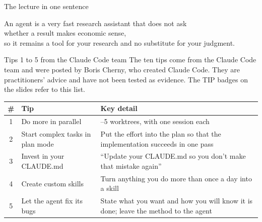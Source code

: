 \documentclass[aspectratio=169,10pt]{beamer}
\newcommand{\emphc}[1]{\textcolor{harvardcrimson}{#1}}
\begin{document}
\begin{frame}{The lecture in one sentence}
\begin{center}
{\large An agent is a very fast research assistant that does not ask\\[4pt] whether a result makes economic sense,}\\[12pt]
{\large \emphc{so it remains a tool for your research and no substitute for your judgment.}}
\end{center}
\end{frame}

\begin{frame}{Tips 1 to 5 from the Claude Code team}
The ten tips come from the Claude Code team and were posted by Boris Cherny, who created Claude Code. They are practitioners' advice and have not been tested as evidence. The TIP badges on the slides refer to this list.

\vspace{0.5em}
\begin{center}
\renewcommand{\arraystretch}{1.45}
\begin{tabular}{@{}c >{\raggedright\arraybackslash}p{4.8cm} >{\raggedright\arraybackslash}p{7.4cm}@{}}
\toprule
\textbf{\#} & \textbf{Tip} & \textbf{Key detail} \\
\midrule
1 & Do more in \emphc{parallel} & 3--5 worktrees, with one session each \\
2 & Start complex tasks in \emphc{plan mode} & Put the effort into the plan so that the implementation succeeds in one pass \\
3 & Invest in your \emphc{CLAUDE.md} & ``Update your CLAUDE.md so you don't make that mistake again'' \\
4 & Create custom \emphc{skills} & Turn anything you do more than once a day into a skill \\
5 & Let the agent fix its \emphc{bugs} & State what you want and how you will know it is done; leave the method to the agent \\
\bottomrule
\end{tabular}
\end{center}
\end{frame}
\end{document}
